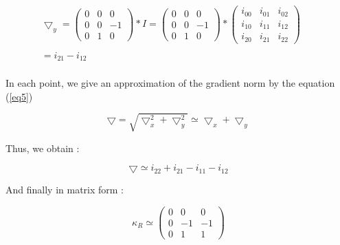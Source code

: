 \documentclass[12pt,a4paper]{article}
\begin{document}
\vspace{1cm}

\begin{equation}\label{eq4}
\begin{matrix}
\bigtriangledown_y = \begin{pmatrix}
0 & 0 & 0 \\ 
0 & 0 & -1 \\ 
0 & 1 & 0
\end{pmatrix}*I  = \begin{pmatrix}
0 & 0 & 0 \\ 
0 & 0 & -1 \\ 
0 & 1 & 0
\end{pmatrix}* \begin{pmatrix}
i_{00} & i_{01} & i_{02} \\ 
i_{10} & i_{11} & i_{12}\\ 
i_{20} & i_{21} & i_{22}
\end{pmatrix}  \\ 
& & \\
 =  i_{21}-i_{12} \\  
\end{matrix}
\end{equation}
 
\vspace{0.5cm}

In each point, we give an approximation of the gradient norm by the equation (\ref{eq5})

\begin{equation}\label{eq5}
\bigtriangledown = \sqrt{\bigtriangledown_x^2 + \bigtriangledown_y^2 } \simeq \bigtriangledown_x + \bigtriangledown_y
\end{equation}

\vspace{0.5cm}

Thus, we obtain :

\begin{equation}\label{eq6}
\bigtriangledown \simeq i_{22}+i_{21}-i_{11}-i_{12}
\end{equation}
 
\vspace{0.25cm}
 
And finally in matrix form : 

\begin{equation}\label{eq7}
\kappa_R  \simeq \begin{pmatrix}
0 & 0 & 0\\ 
0 & -1 & -1\\ 
0 & 1 & 1
\end{pmatrix}
\end{equation}
\end{document}
